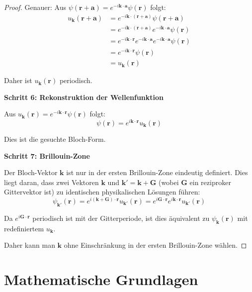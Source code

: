 \documentclass[a4paper,12pt]{article}
\theoremstyle{definition}
\begin{document}
\begin{proof}
	Genauer: Aus $\psi(\mathbf{r} + \mathbf{a}) = e^{-i \mathbf{k} \cdot \mathbf{a}} \psi(\mathbf{r})$ folgt:
	\begin{align}
		u_{\mathbf{k}}(\mathbf{r} + \mathbf{a}) &= e^{-i \mathbf{k} \cdot (\mathbf{r} + \mathbf{a})} \psi(\mathbf{r} + \mathbf{a}) \\
		&= e^{-i \mathbf{k} \cdot (\mathbf{r} + \mathbf{a})} e^{-i \mathbf{k} \cdot \mathbf{a}} \psi(\mathbf{r}) \\
		&= e^{-i \mathbf{k} \cdot \mathbf{r}} e^{-i \mathbf{k} \cdot \mathbf{a}} e^{-i \mathbf{k} \cdot \mathbf{a}} \psi(\mathbf{r}) \\
		&= e^{-i \mathbf{k} \cdot \mathbf{r}} \psi(\mathbf{r}) \\
		&= u_{\mathbf{k}}(\mathbf{r})
	\end{align}
	
	Daher ist $u_{\mathbf{k}}(\mathbf{r})$ periodisch.
	
	\textbf{Schritt 6: Rekonstruktion der Wellenfunktion}
	
	Aus $u_{\mathbf{k}}(\mathbf{r}) = e^{-i \mathbf{k} \cdot \mathbf{r}} \psi(\mathbf{r})$ folgt:
	\[
	\psi(\mathbf{r}) = e^{i \mathbf{k} \cdot \mathbf{r}} u_{\mathbf{k}}(\mathbf{r})
	\]
	
	Dies ist die gesuchte Bloch-Form.
	
	\textbf{Schritt 7: Brillouin-Zone}
	
	Der Bloch-Vektor $\mathbf{k}$ ist nur in der ersten Brillouin-Zone eindeutig definiert. Dies liegt daran, dass zwei Vektoren $\mathbf{k}$ und $\mathbf{k}' = \mathbf{k} + \mathbf{G}$ (wobei $\mathbf{G}$ ein reziproker Gittervektor ist) zu identischen physikalischen Lösungen führen:
	\[
	\psi_{\mathbf{k}'}(\mathbf{r}) = e^{i (\mathbf{k} + \mathbf{G}) \cdot \mathbf{r}} u_{\mathbf{k}'}(\mathbf{r}) = e^{i \mathbf{G} \cdot \mathbf{r}} e^{i \mathbf{k} \cdot \mathbf{r}} u_{\mathbf{k}'}(\mathbf{r})
	\]
	
	Da $e^{i \mathbf{G} \cdot \mathbf{r}}$ periodisch ist mit der Gitterperiode, ist dies äquivalent zu $\psi_{\mathbf{k}}(\mathbf{r})$ mit redefiniertem $u_{\mathbf{k}}$.
	
	Daher kann man $\mathbf{k}$ ohne Einschränkung in der ersten Brillouin-Zone wählen.
\end{proof}

\section{Mathematische Grundlagen}
\end{document}
